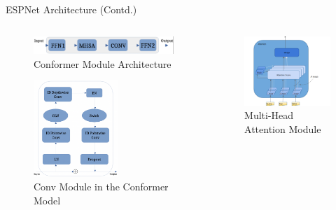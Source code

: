 \documentclass[10pt]{beamer}
\begin{document}
\begin{frame}{ESPNet Architecture (Contd.)}
\begin{columns}
	\begin{column}{0.5\textwidth}
	\begin{figure}
		\centering
		\includegraphics[width = \textwidth]{images/espnet_pipeline.png}
		\caption{Conformer Module Architecture}
	\end{figure}
	\begin{figure}
		\centering
		\includegraphics[width = 0.6\textwidth]{images/conv.png}
		\caption{Conv Module in the Conformer Model}
	\end{figure}
	\end{column}
	\begin{column}{0.5\textwidth}
	\begin{figure}
		\centering
		\includegraphics[width = \textwidth]{images/attention.png}
		\caption{Multi-Head Attention Module}
	\end{figure}
	\end{column}
\end{columns}
\end{frame}
\end{document}
